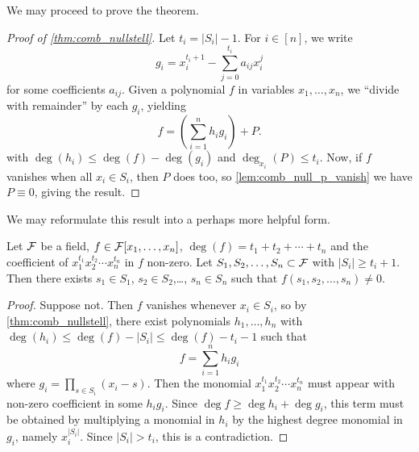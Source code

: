 We may proceed to prove the theorem.
\begin{proof}[Proof of \cref{thm:comb_nullstell}]

Let $t_i = |S_i| - 1$.  For $i\in [n]$, we write
\[
g_i = x_i^{t_i+1} - \sum_{j=0}^{t_i} a_{ij} x_i^j
\]
for some coefficients $a_{ij}$.
Given a polynomial $f$ in variables $x_1,\dotsc, x_n$, we ``divide with remainder'' by each $g_i$, yielding
\[
f = \left( \sum_{i=1}^n h_i g_i \right) + P.
\]
with $\deg(h_i) \leq \deg(f) - \deg (g_i)$ and $\deg_{x_i} (P)\leq t_i$. Now, if $f$ vanishes when all $x_i\in S_i$, then $P$ does too, so \cref{lem:comb_null_p_vanish} we have $P\equiv 0$, giving the result.
\end{proof}

We may reformulate this result into a perhaps more helpful form.

\begin{theorem} \label{thm:comb_nullstell_nonzero}
Let $\mathcal{F}$ be a field, $f\in \mathcal{F}[x_1,\dotsc,x_n]$, $\deg(f) = t_1 + t_2 + \dotsm + t_n$ and the coefficient of $x_1^{t_1}x_2^{t_2}\dotsm x_n^{t_n}$ in $f$  non-zero. Let $S_1,S_2,\dotsc,S_n\subset \mathcal{F}$ with $|S_i| \geq t_i+1$. Then there exists $s_1\in S_1$, $s_2\in S_2$,\ldots, $s_n \in S_n$ such that $f(s_1,s_2,\dotsc,s_n) \neq 0$.
\end{theorem}
\begin{proof}	
Suppose not. Then $f$ vanishes whenever $x_i \in S_i$, so by \cref{thm:comb_nullstell}, there exist polynomials $h_1,\dotsc,h_n$ with $\deg(h_i) \leq \deg (f) - |S_i| \leq \deg (f) - t_i -1$ such that
\[
f = \sum_{i=1}^n h_i g_i
\]
where $g_i = \prod_{s\in S_i}(x_i-s)$. Then the monomial $x_1^{t_1}x_2^{t_2}\dotsm x_n^{t_n}$ must appear with non-zero coefficient in some $h_ig_i$. Since $\deg f \geq \deg h_i + \deg g_i$, this term must be obtained by multiplying a  monomial in $h_i$ by the highest degree monomial in $g_i$, namely $x_i^{|S_i|}$. Since $|S_i| > t_i$, this is a contradiction.
\end{proof}


